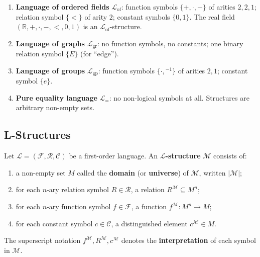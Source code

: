 
\begin{example}
\begin{enumerate}
  \item \textbf{Language of ordered fields} $\mathcal{L}_{\mathrm{of}}$:
        function symbols $\{+, \cdot, -\}$ of arities $2, 2, 1$;
        relation symbol $\{<\}$ of arity $2$;
        constant symbols $\{0, 1\}$.
        The real field $(\mathbb{R}, +, \cdot, -, <, 0, 1)$ is an
        $\mathcal{L}_{\mathrm{of}}$-structure.

  \item \textbf{Language of graphs} $\mathcal{L}_{\mathrm{gr}}$:
        no function symbols, no constants;
        one binary relation symbol $\{E\}$ (for ``edge'').

  \item \textbf{Language of groups} $\mathcal{L}_{\mathrm{gp}}$:
        function symbols $\{\cdot, {}^{-1}\}$ of arities $2, 1$;
        constant symbol $\{e\}$.

  \item \textbf{Pure equality language} $\mathcal{L}_{=}$:
        no non-logical symbols at all. Structures are arbitrary
        non-empty sets.
\end{enumerate}
\end{example}


\subsection{L-Structures}

\begin{tcolorbox}[colback=propbox, colframe=propborder, arc=2pt,
  left=6pt, right=6pt, top=4pt, bottom=4pt,
  title={\small\textbf{Definition ($\mathcal{L}$-Structure)}},
  fonttitle=\small\bfseries]
\label{def:l-structure}
Let $\mathcal{L} = (\mathcal{F}, \mathcal{R}, \mathcal{C})$ be a
first-order language.
An \textbf{$\mathcal{L}$-structure} $\mathcal{M}$ consists of:
\begin{enumerate}
  \item a non-empty set $M$ called the \textbf{domain} (or
        \textbf{universe}) of $\mathcal{M}$, written $|\mathcal{M}|$;
  \item for each $n$-ary relation symbol $R \in \mathcal{R}$,
        a relation $R^{\mathcal{M}} \subseteq M^n$;
  \item for each $n$-ary function symbol $f \in \mathcal{F}$,
        a function $f^{\mathcal{M}} : M^n \to M$;
  \item for each constant symbol $c \in \mathcal{C}$,
        a distinguished element $c^{\mathcal{M}} \in M$.
\end{enumerate}
The superscript notation $f^{\mathcal{M}}, R^{\mathcal{M}}, c^{\mathcal{M}}$
denotes the \textbf{interpretation} of each symbol in $\mathcal{M}$.
\end{tcolorbox}


